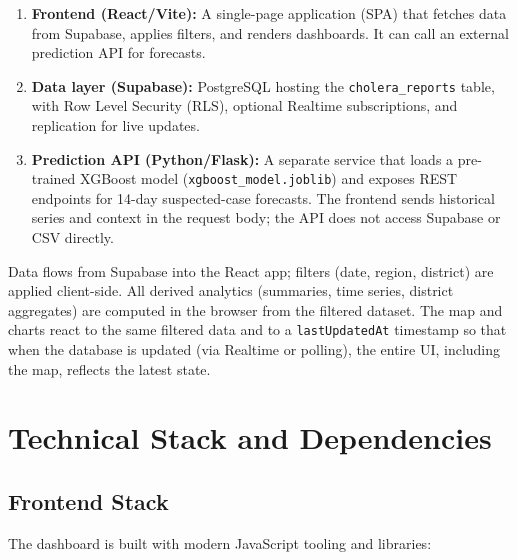 \documentclass[11pt,a4paper]{article}
\begin{document}
\begin{enumerate}[noitemsep]
    \item \textbf{Frontend (React/Vite):} A single-page application (SPA) that fetches data from Supabase, applies filters, and renders dashboards. It can call an external prediction API for forecasts.
    \item \textbf{Data layer (Supabase):} PostgreSQL hosting the \texttt{cholera\_reports} table, with Row Level Security (RLS), optional Realtime subscriptions, and replication for live updates.
    \item \textbf{Prediction API (Python/Flask):} A separate service that loads a pre-trained XGBoost model (\texttt{xgboost\_model.joblib}) and exposes REST endpoints for 14-day suspected-case forecasts. The frontend sends historical series and context in the request body; the API does not access Supabase or CSV directly.
\end{enumerate}

Data flows from Supabase into the React app; filters (date, region, district) are applied client-side. All derived analytics (summaries, time series, district aggregates) are computed in the browser from the filtered dataset. The map and charts react to the same filtered data and to a \texttt{lastUpdatedAt} timestamp so that when the database is updated (via Realtime or polling), the entire UI, including the map, reflects the latest state.

\newpage

\section{Technical Stack and Dependencies}

\subsection{Frontend Stack}

The dashboard is built with modern JavaScript tooling and libraries:
\end{document}
